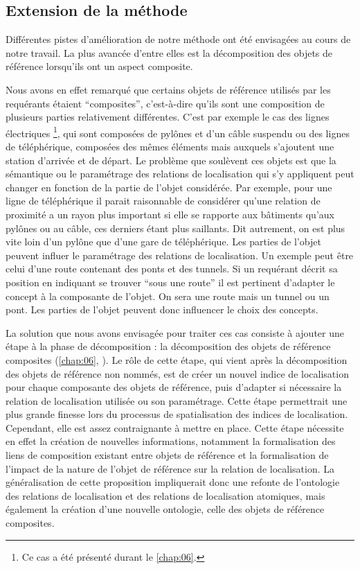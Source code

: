 \subsection*{Extension de la méthode}

Différentes pistes d'amélioration de notre méthode ont été envisagées
au cours de notre travail. La plus avancée d'entre elles est la
décomposition des objets de référence lorsqu'ils ont un aspect
composite.

Nous avons en effet remarqué que certains objets de référence utilisés
par les requérants étaient \enquote{composites}, c'est-à-dire qu'ils
sont une composition de plusieurs parties relativement
différentes. C'est par exemple le cas des lignes électriques
\footnote{Ce cas a été présenté durant le \autoref{chap:06}.}, qui
sont composées de pylônes et d'un câble suspendu ou des lignes de
téléphérique, composées des mêmes éléments mais auxquels s'ajoutent
une station d'arrivée et de départ. Le problème que soulèvent ces
objets est que la sémantique ou le paramétrage des relations de
localisation qui s'y appliquent peut changer en fonction de la partie
de l'objet considérée. Par exemple, pour une ligne de téléphérique il
parait raisonnable de considérer qu'une relation de proximité a un
rayon plus important si elle se rapporte aux bâtiments qu'aux pylônes
ou au câble, ces derniers étant plus saillants. Dit autrement, on est
plus vite loin d'un pylône que d'une gare de téléphérique. Les parties
de l'objet peuvent influer le paramétrage des relations de
localisation. Un exemple peut être celui d'une route contenant des
ponts et des tunnels. Si un requérant décrit sa position en indiquant
se trouver \enquote{sous une route} il est pertinent d'adapter le
concept à la composante de l'objet. On sera
 une route mais
 un tunnel ou un pont. Les parties de
l'objet peuvent donc influencer le choix des concepts.

La solution que nous avons envisagée pour traiter ces cas consiste à
ajouter une étape à la phase de décomposition : la décomposition des
objets de référence composites (\autoref{chap:06},
\autocite{Bunel2019a}). Le rôle de cette étape, qui vient après la
décomposition des objets de référence non nommés, est de créer un
nouvel indice de localisation pour chaque composante des objets de
référence, puis d’adapter si nécessaire la relation de localisation
utilisée ou son paramétrage. Cette étape permettrait une plus grande
finesse lors du processus de spatialisation des indices de
localisation. Cependant, elle est assez contraignante à mettre en
place. Cette étape nécessite en effet la création de nouvelles
informations, notamment la formalisation des liens de composition
existant entre objets de référence et la formalisation de l'impact de
la nature de l'objet de référence sur la relation de localisation. La
généralisation de cette proposition impliquerait donc une refonte de
l'ontologie des relations de localisation et des relations de
localisation atomiques, mais également la création d'une nouvelle
ontologie, celle des objets de référence composites.

